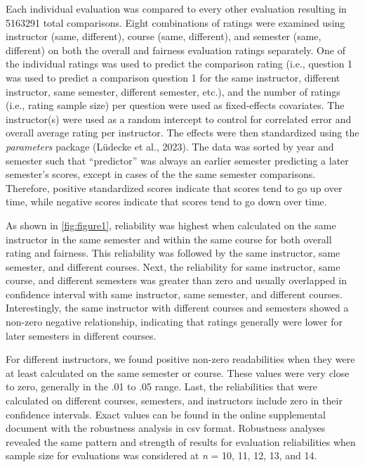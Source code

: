 \documentclass[
  man]{apa7}
\begin{document}
Each individual evaluation was compared to every other evaluation
resulting in 5163291 total comparisons. Eight combinations of
ratings were examined using instructor (same, different), course (same,
different), and semester (same, different) on both the overall and
fairness evaluation ratings separately. One of the individual ratings
was used to predict the comparison rating (i.e., question 1 was used to
predict a comparison question 1 for the same instructor, different
instructor, same semester, different semester, etc.), and the number of
ratings (i.e., rating sample size) per question were used as
fixed-effects covariates. The instructor(s) were used as a random
intercept to control for correlated error and overall average rating per
instructor. The effects were then standardized using the \emph{parameters}
package (Lüdecke et al., 2023). The data was sorted by year and semester such
that ``predictor'' was always an earlier semester predicting a later
semester's scores, except in cases of the the same semester comparisons.
Therefore, positive standardized scores indicate that scores tend to go
up over time, while negative scores indicate that scores tend to go down
over time.

As shown in \ref{fig:figure1}, reliability was highest when calculated
on the same instructor in the same semester and within the same course
for both overall rating and fairness. This reliability was followed by
the same instructor, same semester, and different courses. Next, the
reliability for same instructor, same course, and different semesters
was greater than zero and usually overlapped in confidence interval with
same instructor, same semester, and different courses. Interestingly,
the same instructor with different courses and semesters showed a
non-zero negative relationship, indicating that ratings generally were
lower for later semesters in different courses.

For different instructors, we found positive non-zero readabilities when
they were at least calculated on the same semester or course. These
values were very close to zero, generally in the .01 to .05 range. Last,
the reliabilities that were calculated on different courses, semesters,
and instructors include zero in their confidence intervals. Exact values
can be found in the online supplemental document with the robustness
analysis in csv format. Robustness analyses revealed the same pattern
and strength of results for evaluation reliabilities when sample size
for evaluations was considered at \emph{n} = 10, 11, 12, 13, and 14.
\end{document}
